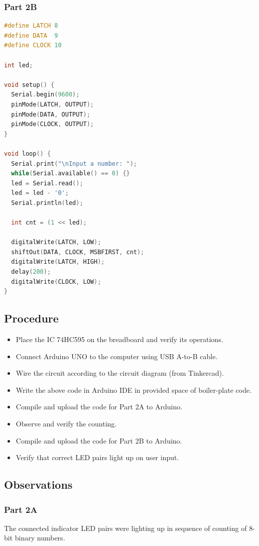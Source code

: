 \documentclass[11pt, a4paper]{article}
\begin{document}
\subsubsection{Part 2B}
\begin{lstlisting}[language=C++, caption={Arduino Code for Part 2B}]
#define LATCH 8
#define DATA  9
#define CLOCK 10

int led;

void setup() {
  Serial.begin(9600);
  pinMode(LATCH, OUTPUT);
  pinMode(DATA, OUTPUT);
  pinMode(CLOCK, OUTPUT);
}

void loop() {
  Serial.print("\nInput a number: ");
  while(Serial.available() == 0) {}
  led = Serial.read();
  led = led - '0';
  Serial.println(led);

  int cnt = (1 << led);

  digitalWrite(LATCH, LOW);
  shiftOut(DATA, CLOCK, MSBFIRST, cnt);
  digitalWrite(LATCH, HIGH);
  delay(200);
  digitalWrite(CLOCK, LOW);
}
\end{lstlisting}

\subsection{Procedure}
\begin{itemize}
    \item Place the IC 74HC595 on the breadboard and verify its operations.
    \item Connect Arduino UNO to the computer using USB A-to-B cable.
    \item Wire the circuit according to the circuit diagram (from Tinkercad).
    \item Write the above code in Arduino IDE in provided space of boiler-plate code.
    \item Compile and upload the code for Part 2A to Arduino.
    \item Observe and verify the counting.
    \item Compile and upload the code for Part 2B to Arduino.
    \item Verify that correct LED pairs light up on user input.
\end{itemize}

\subsection{Observations}
\subsubsection{Part 2A}
The connected indicator LED pairs were lighting up in sequence of counting of 8-bit binary numbers.
\end{document}
